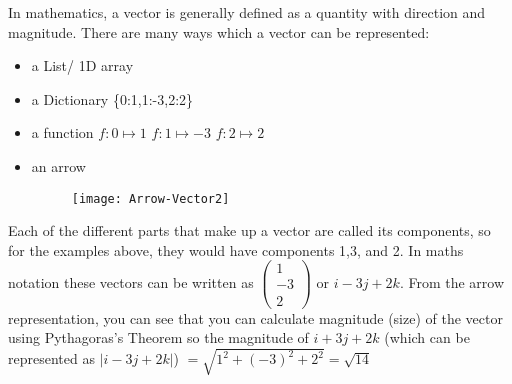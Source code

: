   In mathematics, a vector is generally defined as a quantity with direction and magnitude. There are many ways which a vector can be represented:
  \begin{itemize}
  	\item a List/ 1D array
	  	\subitem [1,-3,2]
  	\item a Dictionary
	  	\subitem \{0:1,1:-3,2:2\}
  	\item a function
	  	\subitem $f:0\mapsto1$
	  	\subitem $f:1\mapsto-3$
	  	\subitem $f:2\mapsto2$ 
  	\item an arrow
	  	\begin{figure}[H]
		  	\texttt{[image: Arrow-Vector2]}
	  	\end{figure}
  \end{itemize}
  Each of the different parts that make up a vector are called its components, so for the examples above, they would have components 1,3, and 2. In maths notation these vectors can be written as $ \left( \begin{smallmatrix} 1 \\ -3 \\ 2\end{smallmatrix}\right)  $ or $i - 3j + 2k$. From the arrow representation, you can see that you can calculate magnitude (size) of the vector using Pythagoras's Theorem so the magnitude of $i + 3j + 2k$ (which can be represented as $|i - 3j + 2k|$) $ = \sqrt{1^2+(-3)^2+2^2} = \sqrt{14}$
  
